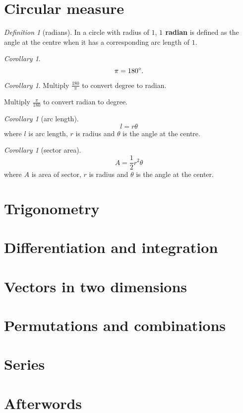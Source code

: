 \documentclass[8pt]{article}
\theoremstyle{remark}
\newtheorem{corollary}[theorem]{Corollary}
\newtheorem{definition}[theorem]{Definition}
\begin{document}
    \section{Circular measure}
        \begin{definition}[radians]
            In a circle with radius of $1$, \textbf{$1$ radian} is defined as the angle at the centre when it has a corresponding arc length of $1$.
        \end{definition}

        \begin{corollary}
            $$
                \pi = 180^\circ.
            $$
        \end{corollary}

        \begin{corollary}
            Multiply $\frac{180}{\pi}$ to convert degree to radian.
            
            Multiply $\frac{\pi}{180}$ to convert radian to degree.
        \end{corollary}

        \begin{corollary}[arc length]
            $$l = r \theta$$
            where $l$ is arc length, $r$ is radius and $\theta$ is the angle at the centre.
        \end{corollary}

        \begin{corollary}[sector area]
            $$A = \frac{1}{2} r^2 \theta$$
            where $A$ is area of sector, $r$ is radius and $\theta$ is the angle at the center.
        \end{corollary}

    \section{Trigonometry}
        
        

    \section{Differentiation and integration}

        

    \section{Vectors in two dimensions}

        

    \section{Permutations and combinations}

        

    \section{Series}

        

    \section*{Afterwords}

        
\end{document}
